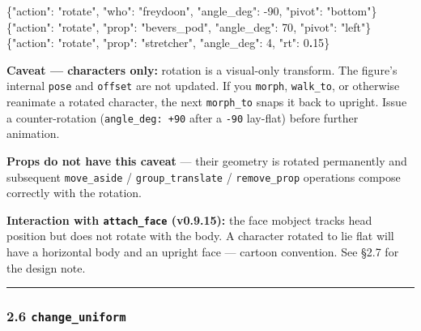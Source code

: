\documentclass[
  12pt,
  letterpaper,
]{book}
\newenvironment{Shaded}{}{}
\newcommand{\DataTypeTok}[1]{\textcolor[rgb]{0.56,0.13,0.00}{#1}}
\newcommand{\DecValTok}[1]{\textcolor[rgb]{0.25,0.63,0.44}{#1}}
\newcommand{\ErrorTok}[1]{\textcolor[rgb]{1.00,0.00,0.00}{\textbf{#1}}}
\newcommand{\FunctionTok}[1]{\textcolor[rgb]{0.02,0.16,0.49}{#1}}
\newcommand{\StringTok}[1]{\textcolor[rgb]{0.25,0.44,0.63}{#1}}
\begin{document}
\begin{Shaded}
\begin{Highlighting}[]
\FunctionTok{\{}\DataTypeTok{"action"}\FunctionTok{:} \StringTok{"rotate"}\FunctionTok{,} \DataTypeTok{"who"}\FunctionTok{:} \StringTok{"freydoon"}\FunctionTok{,} \DataTypeTok{"angle\_deg"}\FunctionTok{:} \DecValTok{{-}90}\FunctionTok{,} \DataTypeTok{"pivot"}\FunctionTok{:} \StringTok{"bottom"}\FunctionTok{\}}
\FunctionTok{\{}\DataTypeTok{"action"}\FunctionTok{:} \StringTok{"rotate"}\FunctionTok{,} \DataTypeTok{"prop"}\FunctionTok{:} \StringTok{"bevers\_pod"}\FunctionTok{,} \DataTypeTok{"angle\_deg"}\FunctionTok{:} \DecValTok{70}\FunctionTok{,} \DataTypeTok{"pivot"}\FunctionTok{:} \StringTok{"left"}\FunctionTok{\}}
\FunctionTok{\{}\DataTypeTok{"action"}\FunctionTok{:} \StringTok{"rotate"}\FunctionTok{,} \DataTypeTok{"prop"}\FunctionTok{:} \StringTok{"stretcher"}\FunctionTok{,}  \DataTypeTok{"angle\_deg"}\FunctionTok{:} \DecValTok{4}\FunctionTok{,}  \DataTypeTok{"rt"}\FunctionTok{:} \DecValTok{0}\ErrorTok{.}\DecValTok{15}\FunctionTok{\}}
\end{Highlighting}
\end{Shaded}

\textbf{Caveat --- characters only:} rotation is a visual-only
transform. The figure's internal \texttt{pose} and \texttt{offset} are
not updated. If you \texttt{morph}, \texttt{walk\_to}, or otherwise
reanimate a rotated character, the next \texttt{morph\_to} snaps it back
to upright. Issue a counter-rotation (\texttt{angle\_deg:\ +90} after a
\texttt{-90} lay-flat) before further animation.

\textbf{Props do not have this caveat} --- their geometry is rotated
permanently and subsequent \texttt{move\_aside} /
\texttt{group\_translate} / \texttt{remove\_prop} operations compose
correctly with the rotation.

\textbf{Interaction with \texttt{attach\_face} (v0.9.15):} the face
mobject tracks head position but does not rotate with the body. A
character rotated to lie flat will have a horizontal body and an upright
face --- cartoon convention. See §2.7 for the design note.

\begin{center}\rule{0.5\linewidth}{0.5pt}\end{center}

\subsubsection{\texorpdfstring{2.6
\texttt{change\_uniform}}{2.6 change\_uniform}}\label{change_uniform}
\end{document}
